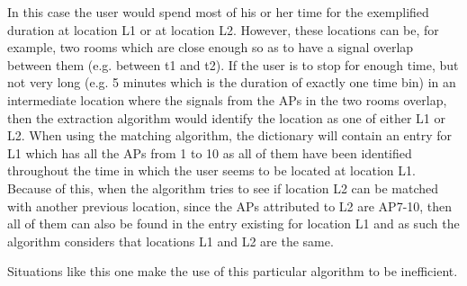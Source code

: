 In this case the user would spend most of his or her time for the exemplified
duration at location L1 or at location L2. However, these locations can be, for
example, two rooms which are close enough so as to have a signal overlap between
them (e.g. between t1 and t2). If the user is to stop for enough time, but not
very long (e.g. 5 minutes which is the duration of exactly one time bin) in an
intermediate location where the signals from the APs in the two rooms overlap,
then the extraction algorithm would identify the location as one of either L1 or
L2. When using the matching algorithm, the dictionary will contain an entry for
L1 which has all the APs from 1 to 10 as all of them have been identified
throughout the time in which the user seems to be located at location L1.
Because of this, when the algorithm tries to see if location L2 can be matched
with another previous location, since the APs attributed to L2 are AP7-10, then
all of them can also be found in the entry existing for location L1 and as such
the algorithm considers that locations L1 and L2 are the same.

Situations like this one make the use of this particular algorithm to be
inefficient.

